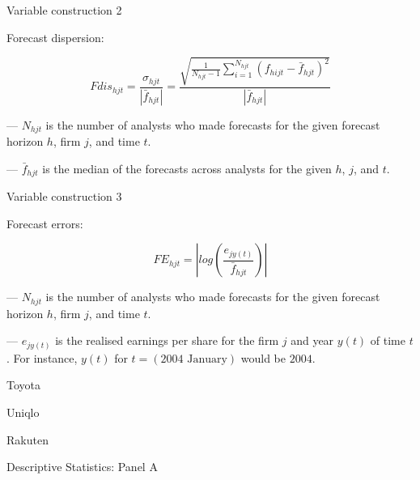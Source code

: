 \documentclass[aspectratio=169]{beamer}
\begin{document}
\begin{frame}{Variable construction 2}

Forecast dispersion:

\begin{equation}
Fdis_{hjt} = \frac{\sigma_{hjt}}{| \bar{f}_{hjt} |} = \frac{\sqrt{\frac{1}{N_{hjt}-1} \sum_{i=1}^{N_{hjt}} (f_{hijt} - \bar{f}_{hjt})^2}}{| \bar{f}_{hjt} |}
\end{equation}

\vspace{2em}
--- $N_{hjt}$ is the number of analysts who made forecasts for the given forecast horizon $h$, firm $j$, and time $t$.

\vspace{1em}
--- $\bar{f}_{hjt}$ is the median of the forecasts across analysts for the given $h$, $j$, and $t$.

\end{frame}


\begin{frame}{Variable construction 3}

Forecast errors:

\begin{equation}
FE_{hjt} = | log(\frac{e_{jy(t)}}{\bar{f}_{hjt}}) |
\end{equation}

\vspace{1em}
--- $N_{hjt}$ is the number of analysts who made forecasts for the given forecast horizon $h$, firm $j$, and time $t$.

\vspace{1em}
--- $e_{jy(t)}$ is the realised earnings per share for the firm $j$ and year $y(t)$ of time $t$. For instance, $y(t)$ for $t=(2004 \text{~January})$ would be $2004$.


\end{frame}



\begin{frame}{Toyota}
    
\end{frame}

\begin{frame}{Uniqlo}
    
\end{frame}

\begin{frame}{Rakuten}
    
\end{frame}

\begin{frame}{Descriptive Statistics: Panel A}

\begin{table}
\centering

\label{tab:desc_stats}
\end{table}

\end{frame}
\end{document}

